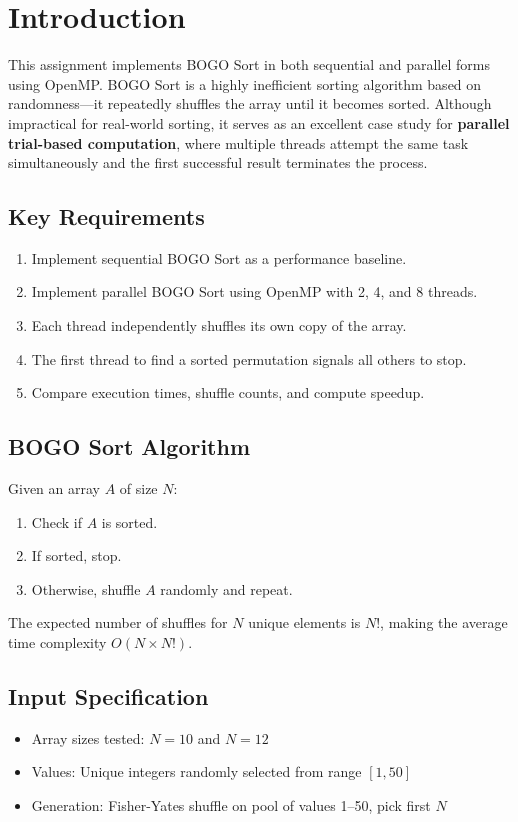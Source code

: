 \documentclass[11pt]{article}
\begin{document}
\section{Introduction}
This assignment implements BOGO Sort in both sequential and parallel forms using OpenMP. BOGO Sort is a highly inefficient sorting algorithm based on randomness---it repeatedly shuffles the array until it becomes sorted. Although impractical for real-world sorting, it serves as an excellent case study for \textbf{parallel trial-based computation}, where multiple threads attempt the same task simultaneously and the first successful result terminates the process.

\subsection{Key Requirements}
\begin{enumerate}
    \item Implement sequential BOGO Sort as a performance baseline.
    \item Implement parallel BOGO Sort using OpenMP with 2, 4, and 8 threads.
    \item Each thread independently shuffles its own copy of the array.
    \item The first thread to find a sorted permutation signals all others to stop.
    \item Compare execution times, shuffle counts, and compute speedup.
\end{enumerate}

\subsection{BOGO Sort Algorithm}
Given an array $A$ of size $N$:
\begin{enumerate}
    \item Check if $A$ is sorted.
    \item If sorted, stop.
    \item Otherwise, shuffle $A$ randomly and repeat.
\end{enumerate}

The expected number of shuffles for $N$ unique elements is $N!$, making the average time complexity $O(N \times N!)$.

\subsection{Input Specification}
\begin{itemize}
    \item Array sizes tested: $N = 10$ and $N = 12$
    \item Values: Unique integers randomly selected from range $[1, 50]$
    \item Generation: Fisher-Yates shuffle on pool of values 1--50, pick first $N$
\end{itemize}
\end{document}
